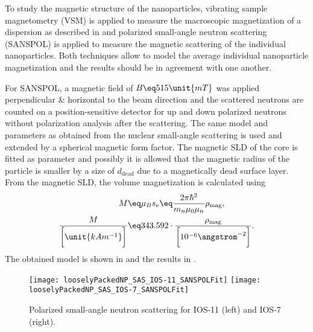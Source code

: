 \documentclass[\main/dresen_thesis.tex]{subfiles}
\begin{document}
To study the magnetic structure of the nanoparticles, vibrating sample magnetometry (VSM) is applied to measure the macroscopic magnetization of a dispersion as described in  and polarized small-angle neutron scattering (SANSPOL) is applied to measure the magnetic scattering of the individual nanoparticles.
Both techniques allow to model the average individual nanoparticle magnetization and the results should be in agreement with one another.

For SANSPOL, a magnetic field of $B\eq 515 \unit{mT}$ was applied perpendicular \& horizontal to the beam direction and the scattered neutrons are counted on a position-sensitive detector for up and down polarized neutrons without polarization analysis after the scattering.
The same model and parameters as obtained from the nuclear small-angle scattering is used and extended by a spherical magnetic form factor.
The magnetic SLD of the core is fitted as parameter and possibly it is allowed that the magnetic radius of the particle is smaller by a size of $d_\mathrm{dead}$ due to a magnetically dead surface layer.
From the magnetic SLD, the volume magnetization is calculated using 
\begin{align}
  M \eq& \mu_B s_e \eq \frac{2 \pi \hbar^2}{m_n \mu_0 \mu_n} \rho_\mathrm{mag},\\
  \frac{M}{\bigg[\unit{kA m^{-1}}\bigg]} \eq& 343.592 \cdot \frac{\rho_\mathrm{mag}}{\bigg[10^{-6} \angstrom^{-2} \bigg]}.
\end{align}
The obtained model is shown in  and the results in .

\begin{figure}[tb]
  \centering
  \texttt{[image: looselyPackedNP\_SAS\_IOS-11\_SANSPOLFit]}
  \texttt{[image: looselyPackedNP\_SAS\_IOS-7\_SANSPOLFit]}
  \caption{\label{fig:looselyPackedNP:nanoparticle:sanspol}Polarized small-angle neutron scattering for IOS-11 (left) and IOS-7 (right).}
\end{figure}
\end{document}
